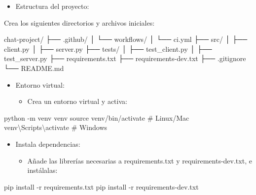 \documentclass[
  a4paper,
  DIV=11,
  numbers=noendperiod,
  onepage,
  openany]{scrreprt}
\newenvironment{Shaded}{\begin{snugshade}}{\end{snugshade}}
\newcommand{\AttributeTok}[1]{\textcolor[rgb]{0.40,0.45,0.13}{#1}}
\newcommand{\BuiltInTok}[1]{\textcolor[rgb]{0.00,0.23,0.31}{#1}}
\newcommand{\CommentTok}[1]{\textcolor[rgb]{0.37,0.37,0.37}{#1}}
\newcommand{\ExtensionTok}[1]{\textcolor[rgb]{0.00,0.23,0.31}{#1}}
\newcommand{\NormalTok}[1]{\textcolor[rgb]{0.00,0.23,0.31}{#1}}
\providecommand{\tightlist}{%
  \setlength{\itemsep}{0pt}\setlength{\parskip}{0pt}}\usepackage{longtable,booktabs,array}
\begin{document}
\begin{itemize}
\tightlist
\item
  Estructura del proyecto:
\end{itemize}

Crea los siguientes directorios y archivos iniciales:

\begin{Shaded}
\begin{Highlighting}[]
\NormalTok{chat{-}project/}
\NormalTok{├── .github/}
\NormalTok{│   └── workflows/}
\NormalTok{│       └── ci.yml}
\NormalTok{├── src/}
\NormalTok{│   ├── client.py}
\NormalTok{│   ├── server.py}
\NormalTok{├── tests/}
\NormalTok{│   ├── test\_client.py}
\NormalTok{│   ├── test\_server.py}
\NormalTok{├── requirements.txt}
\NormalTok{├── requirements{-}dev.txt}
\NormalTok{├── .gitignore}
\NormalTok{└── README.md}
\end{Highlighting}
\end{Shaded}

\begin{itemize}
\item
  Entorno virtual:

  \begin{itemize}
  \tightlist
  \item
    Crea un entorno virtual y activa:
  \end{itemize}
\end{itemize}

\begin{Shaded}
\begin{Highlighting}[]
\ExtensionTok{python} \AttributeTok{{-}m}\NormalTok{ venv venv}
\BuiltInTok{source}\NormalTok{ venv/bin/activate  }\CommentTok{\# Linux/Mac}
\ExtensionTok{venv\textbackslash{}Scripts\textbackslash{}activate}  \CommentTok{\# Windows}
\end{Highlighting}
\end{Shaded}

\begin{itemize}
\item
  Instala dependencias:

  \begin{itemize}
  \tightlist
  \item
    Añade las librerías necesarias a requirements.txt y
    requirements-dev.txt, e instálalas:
  \end{itemize}
\end{itemize}

\begin{Shaded}
\begin{Highlighting}[]
\ExtensionTok{pip}\NormalTok{ install }\AttributeTok{{-}r}\NormalTok{ requirements.txt}
\ExtensionTok{pip}\NormalTok{ install }\AttributeTok{{-}r}\NormalTok{ requirements{-}dev.txt}
\end{Highlighting}
\end{Shaded}
\end{document}
